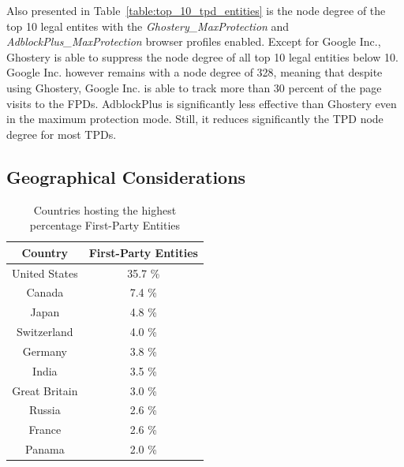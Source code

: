 \documentclass[compsoc, conference, letterpaper, 10pt, times]{IEEEtran}
\begin{document}
Also presented in Table~\ref{table:top_10_tpd_entities} is the node degree of the top 10 legal entites with the \textit{Ghostery\_MaxProtection} and \textit{AdblockPlus\_MaxProtection} browser profiles enabled. Except for Google Inc., Ghostery is able to suppress the node degree of all top 10 legal entities below 10. Google Inc. however remains with a node degree of 328, meaning that despite using Ghostery, Google Inc. is able to track more than 30 percent of the page visits to the FPDs. AdblockPlus is significantly less effective than Ghostery even in the maximum protection mode. Still, it reduces significantly the TPD node degree for most TPDs.
 



\subsection{Geographical Considerations}


  \begin{table}
  \centering
  \begin{tabular}{|c|c|}
  \hline
  Country & First-Party Entities \\
  \hline
  United States & 35.7 \% \\
  Canada & 7.4 \% \\
  Japan & 4.8 \% \\
  Switzerland & 4.0 \% \\
  Germany & 3.8 \% \\
  India & 3.5 \% \\
  Great Britain & 3.0 \% \\
  Russia & 2.6 \% \\
  France & 2.6 \% \\
  Panama & 2.0 \% \\
  \hline
  \end{tabular}
  \caption{Countries hosting the highest percentage First-Party Entities}
  \label{table:top_10_first_party_countries}
  \end{table}
  
\end{document}
